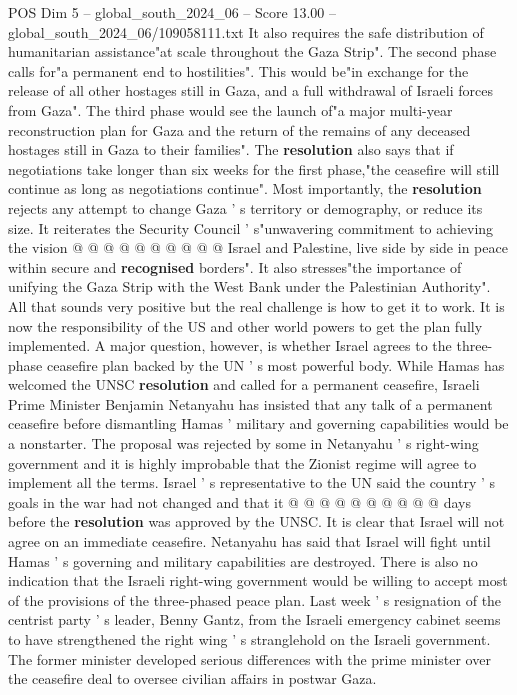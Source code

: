 \begin{textsample}{POS Dim 5 – global\_south\_2024\_06 – Score 13.00 – global\_south\_2024\_06/109058111.txt}
It also requires the safe distribution of humanitarian assistance"at scale throughout the Gaza Strip".
The second phase calls for"a permanent end to hostilities".
This would be"in exchange for the release of all other hostages still in Gaza, and a full withdrawal of Israeli forces from Gaza".
The third phase would see the launch of"a major multi-year reconstruction plan for Gaza and the return of the remains of any deceased hostages still in Gaza to their families".
The \textbf{resolution} also says that if negotiations take longer than six weeks for the first phase,"the ceasefire will still continue as long as negotiations continue".
Most importantly, the \textbf{resolution} rejects any attempt to change Gaza ' s territory or demography, or reduce its size.
It reiterates the Security Council ' s"unwavering commitment to achieving the vision @ @ @ @ @ @ @ @ @ @ Israel and Palestine, live side by side in peace within secure and \textbf{recognised} borders".
It also stresses"the importance of unifying the Gaza Strip with the West Bank under the Palestinian Authority".
All that sounds very positive but the real challenge is how to get it to work.
It is now the responsibility of the US and other world powers to get the plan fully implemented.
A major question, however, is whether Israel agrees to the three-phase ceasefire plan backed by the UN ' s most powerful body.
While Hamas has welcomed the UNSC \textbf{resolution} and called for a permanent ceasefire, Israeli Prime Minister Benjamin Netanyahu has insisted that any talk of a permanent ceasefire before dismantling Hamas ' military and governing capabilities would be a nonstarter.
The proposal was rejected by some in Netanyahu ' s right-wing government and it is highly improbable that the Zionist regime will agree to implement all the terms.
Israel ' s representative to the UN said the country ' s goals in the war had not changed and that it @ @ @ @ @ @ @ @ @ @ days before the \textbf{resolution} was approved by the UNSC.
It is clear that Israel will not agree on an immediate ceasefire.
Netanyahu has said that Israel will fight until Hamas ' s governing and military capabilities are destroyed.
There is also no indication that the Israeli right-wing government would be willing to accept most of the provisions of the three-phased peace plan.
Last week ' s resignation of the centrist party ' s leader, Benny Gantz, from the Israeli emergency cabinet seems to have strengthened the right wing ' s stranglehold on the Israeli government.
The former minister developed serious differences with the prime minister over the ceasefire deal to oversee civilian affairs in postwar Gaza.

\end{textsample}
